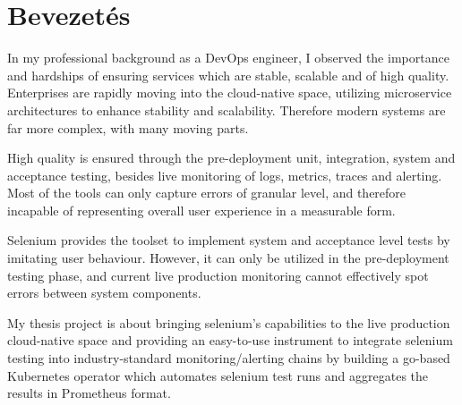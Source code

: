 \chapter{Bevezetés}
\label{ch:intro}

In my professional background as a DevOps engineer, I observed the importance and hardships of ensuring services which are stable, scalable and of high quality. Enterprises are rapidly moving into the cloud-native space, utilizing microservice architectures to enhance stability and scalability. Therefore modern systems are far more complex, with many moving parts.

High quality is ensured through the pre-deployment unit, integration, system and acceptance testing, besides live monitoring of logs, metrics, traces and alerting. Most of the tools can only capture errors of granular level, and therefore incapable of representing overall user experience in a measurable form.

Selenium provides the toolset to implement system and acceptance level tests by imitating user behaviour. However, it can only be utilized in the pre-deployment testing phase, and current live production monitoring cannot effectively spot errors between system components.

My thesis project is about bringing selenium's capabilities to the live production cloud-native space and providing an easy-to-use instrument to integrate selenium testing into industry-standard monitoring/alerting chains by building a go-based Kubernetes operator which automates selenium test runs and aggregates the results in Prometheus format.